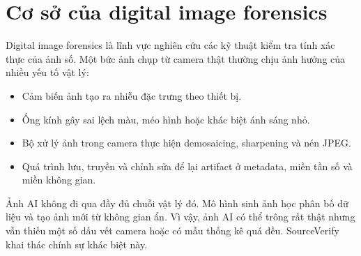 \section{Cơ sở của digital image forensics}
Digital image forensics là lĩnh vực nghiên cứu các kỹ thuật kiểm tra tính xác thực của ảnh số. Một bức ảnh chụp từ camera thật thường chịu ảnh hưởng của nhiều yếu tố vật lý:
\begin{itemize}
  \item Cảm biến ảnh tạo ra nhiễu đặc trưng theo thiết bị.
  \item Ống kính gây sai lệch màu, méo hình hoặc khác biệt ánh sáng nhỏ.
  \item Bộ xử lý ảnh trong camera thực hiện demosaicing, sharpening và nén JPEG.
  \item Quá trình lưu, truyền và chỉnh sửa để lại artifact ở metadata, miền tần số và miền không gian.
\end{itemize}

Ảnh AI không đi qua đầy đủ chuỗi vật lý đó. Mô hình sinh ảnh học phân bố dữ liệu và tạo ảnh mới từ không gian ẩn. Vì vậy, ảnh AI có thể trông rất thật nhưng vẫn thiếu một số dấu vết camera hoặc có mẫu thống kê quá đều. SourceVerify khai thác chính sự khác biệt này.
